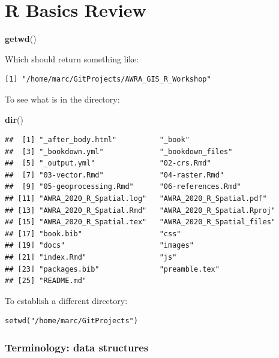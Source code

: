 \documentclass[
]{book}
\newenvironment{Shaded}{\begin{snugshade}}{\end{snugshade}}
\newcommand{\KeywordTok}[1]{\textcolor[rgb]{0.13,0.29,0.53}{\textbf{#1}}}
\newcommand{\NormalTok}[1]{#1}
\begin{document}
\hypertarget{r-basics-review}{%
\section{R Basics Review}\label{r-basics-review}}

\begin{Shaded}
\begin{Highlighting}[]
\KeywordTok{getwd}\NormalTok{()}
\end{Highlighting}
\end{Shaded}

Which should return something like:

\begin{verbatim}
[1] "/home/marc/GitProjects/AWRA_GIS_R_Workshop"
\end{verbatim}

To see what is in the directory:

\begin{Shaded}
\begin{Highlighting}[]
\KeywordTok{dir}\NormalTok{()}
\end{Highlighting}
\end{Shaded}

\begin{verbatim}
##  [1] "_after_body.html"          "_book"                    
##  [3] "_bookdown.yml"             "_bookdown_files"          
##  [5] "_output.yml"               "02-crs.Rmd"               
##  [7] "03-vector.Rmd"             "04-raster.Rmd"            
##  [9] "05-geoprocessing.Rmd"      "06-references.Rmd"        
## [11] "AWRA_2020_R_Spatial.log"   "AWRA_2020_R_Spatial.pdf"  
## [13] "AWRA_2020_R_Spatial.Rmd"   "AWRA_2020_R_Spatial.Rproj"
## [15] "AWRA_2020_R_Spatial.tex"   "AWRA_2020_R_Spatial_files"
## [17] "book.bib"                  "css"                      
## [19] "docs"                      "images"                   
## [21] "index.Rmd"                 "js"                       
## [23] "packages.bib"              "preamble.tex"             
## [25] "README.md"
\end{verbatim}

To establish a different directory:

\begin{verbatim}
setwd("/home/marc/GitProjects")
\end{verbatim}

\hypertarget{terminology-data-structures}{%
\subsubsection{\texorpdfstring{\textbf{Terminology: data structures}}{Terminology: data structures}}\label{terminology-data-structures}}
\end{document}
